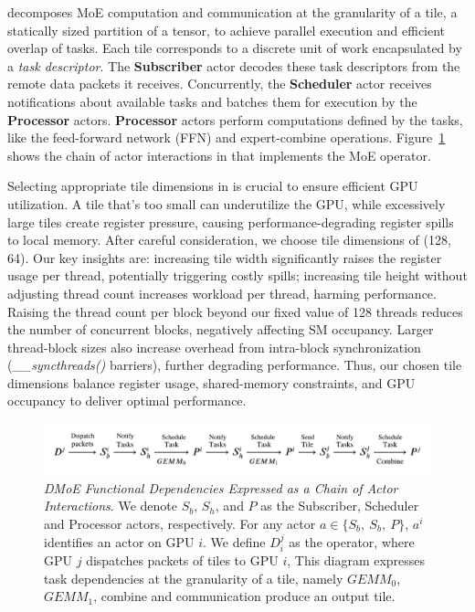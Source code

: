 \sysname decomposes MoE computation and communication at the granularity of a tile, a statically sized partition of a tensor, to achieve parallel execution and efficient overlap of tasks. Each tile corresponds to a discrete unit of work encapsulated by a \emph{task descriptor}. The \textbf{Subscriber} actor decodes these task descriptors from the remote data packets it receives. Concurrently, the \textbf{Scheduler} actor receives notifications about available tasks and batches them for execution by the \textbf{Processor} actors. \textbf{Processor} actors perform computations defined by the tasks, like the feed-forward network (FFN) and expert-combine operations. Figure~\ref{fig:actors} shows the chain of actor interactions in \sysname that implements the MoE operator.

Selecting appropriate tile dimensions in \sysname is crucial to ensure efficient GPU utilization. A tile that's too small can underutilize the GPU, while excessively large tiles create register pressure, causing performance-degrading register spills to local memory. After careful consideration, we choose tile dimensions of (128, 64). Our key insights are: increasing tile width significantly raises the register usage per thread, potentially triggering costly spills; increasing tile height without adjusting thread count increases workload per thread, harming performance. Raising the thread count per block beyond our fixed value of 128 threads reduces the number of concurrent blocks, negatively affecting SM occupancy. Larger thread-block sizes also increase overhead from intra-block synchronization (\emph{\_\_syncthreads()} barriers), further degrading performance. Thus, our chosen tile dimensions balance register usage, shared-memory constraints, and GPU occupancy to deliver optimal performance.

\begin{figure}[!ht]
    \centering
    \vspace{-3mm}
    \includegraphics[width=\linewidth]{figures/actors}
    \caption{\emph{DMoE Functional Dependencies Expressed as a Chain of Actor Interactions}.
    We denote $S_b$, $S_h$, and $P$ as the
    Subscriber, Scheduler and Processor actors, respectively. For any actor $a \in \{S_b,\>S_b,\>P\}$,
        $a^i$ identifies an actor on GPU $i$. We define $D^j_i$ as the operator,
        where GPU $j$ dispatches packets of tiles to GPU $i$,
        This diagram expresses task dependencies at the granularity of a tile, namely
        $GEMM_0$, $GEMM_1$, combine and communication produce an output tile.
    }
    \label{fig:actors}
    \vspace{-4mm}
\end{figure}

